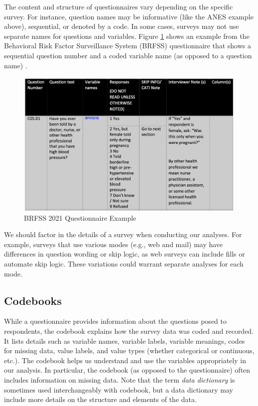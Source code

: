 \documentclass[
]{krantz}
\begin{document}
The content and structure of questionnaires vary depending on the specific survey. For instance, question names may be informative (like the ANES example above), sequential, or denoted by a code. In some cases, surveys may not use separate names for questions and variables. Figure \ref{fig:understand-que-examp-2} shows an example from the Behavioral Risk Factor Surveillance System (BRFSS) questionnaire that shows a sequential question number and a coded variable name (as opposed to a question name) \citep{brfss-svy}.

\begin{figure}
\includegraphics{images/questionnaire-example-2} \caption{BRFSS 2021 Questionnaire Example}\label{fig:understand-que-examp-2}
\end{figure}

We should factor in the details of a survey when conducting our analyses. For example, surveys that use various modes (e.g., web and mail) may have differences in question wording or skip logic, as web surveys can include fills or automate skip logic. These variations could warrant separate analyses for each mode.

\hypertarget{codebooks}{%
\subsection{Codebooks}\label{codebooks}}

While a questionnaire provides information about the questions posed to respondents, the codebook explains how the survey data was coded and recorded. It lists details such as variable names, variable labels, variable meanings, codes for missing data, value labels, and value types (whether categorical or continuous, etc.). The codebook helps us understand and use the variables appropriately in our analysis. In particular, the codebook (as opposed to the questionnaire) often includes information on missing data. Note that the term \emph{data dictionary} is sometimes used interchangeably with codebook, but a data dictionary may include more details on the structure and elements of the data.
\end{document}
